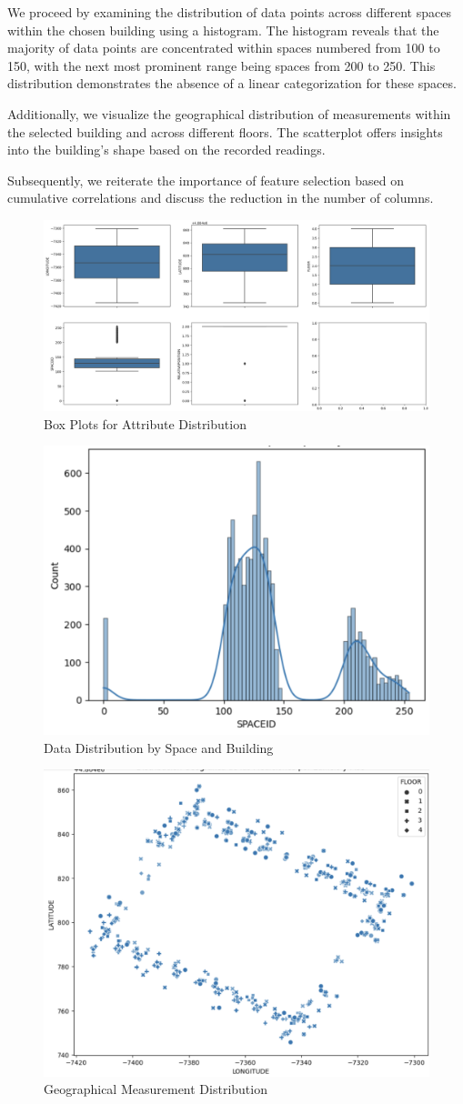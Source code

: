 \documentclass[conference]{IEEEtran}
\begin{document}
We proceed by examining the distribution of data points across different spaces within the chosen building using a histogram. The histogram reveals that the majority of data points are concentrated within spaces numbered from 100 to 150, with the next most prominent range being spaces from 200 to 250. This distribution demonstrates the absence of a linear categorization for these spaces.

Additionally, we visualize the geographical distribution of measurements within the selected building and across different floors. The scatterplot offers insights into the building's shape based on the recorded readings.

Subsequently, we reiterate the importance of feature selection based on cumulative correlations and discuss the reduction in the number of columns. 

\begin{figure}[h!]
    \centering
    \includegraphics[width=0.5\linewidth]{Images/image5.png}
    \caption{Box Plots for Attribute Distribution}
    \label{fig:enter-label}
\end{figure}

\begin{figure}[h!]
    \centering
    \includegraphics[width=0.5\linewidth]{Images/Image6.png}
    \caption{Data Distribution by Space and Building}
    \label{fig:enter-label}
\end{figure}

\begin{figure}[h!]
    \centering
    \includegraphics[width=0.5\linewidth]{Images/Image7.png}
    \caption{Geographical Measurement Distribution}
    \label{fig:enter-label}
\end{figure}
\end{document}
